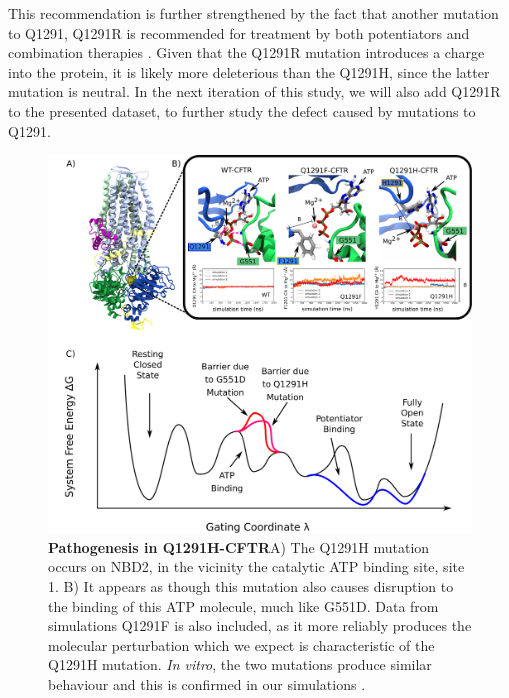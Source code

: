 This recommendation is further strengthened by the fact that another mutation to Q1291, Q1291R is recommended for treatment by both potentiators and combination therapies \cite{trikafta_website, trikafta_FDA_info, kalydeco_FDA_approval}. Given that the Q1291R mutation introduces a charge into the protein, it is likely more deleterious than the Q1291H, since the latter mutation is neutral. In the next iteration of this study, we will also add Q1291R to the presented dataset, to further study the defect caused by mutations to Q1291. 


\begin{figure}
	\begin{center}
		\includegraphics[width=\textwidth]{figures/perspective/Q1291.pdf}
	\end{center}
	\captionsetup{singlelinecheck = false, justification=raggedright}
	\caption[Pathogenesis in Q1291H-CFTR]{\textbf{Pathogenesis in Q1291H-CFTR}{A) The Q1291H mutation occurs on NBD2, in the vicinity the catalytic ATP binding site, site 1. B) It appears as though this mutation also causes disruption to the binding of this ATP molecule, much like G551D. Data from simulations Q1291F is also included, as it more reliably produces the molecular perturbation which we expect is characteristic of the Q1291H mutation. \textit{In vitro}, the two mutations produce similar behaviour and this is confirmed in our simulations \cite{dong2015}. }}

	\label{Q1291H_results}

\end{figure}


